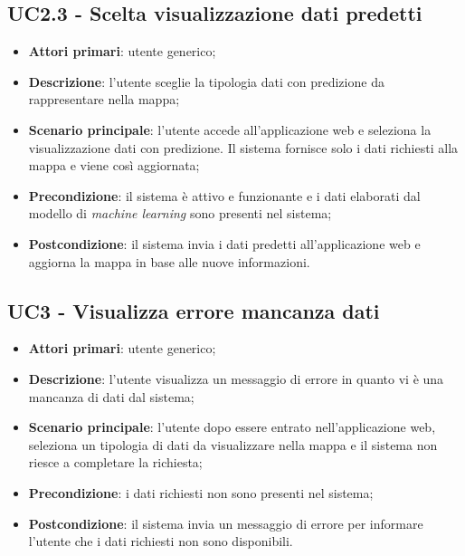 \subsection{UC2.3 - Scelta visualizzazione dati predetti}
\begin{itemize}
	\item \textbf{Attori primari}: utente generico;
	\item \textbf{Descrizione}: l'utente sceglie la tipologia dati con predizione da rappresentare nella mappa;
	\item \textbf{Scenario principale}: l'utente accede all'applicazione web e seleziona la visualizzazione dati con predizione. Il sistema fornisce solo i dati richiesti alla mappa e viene così aggiornata;
	\item \textbf{Precondizione}: il sistema è attivo e funzionante e i dati elaborati dal modello di \textit{machine learning} sono presenti nel sistema;
	\item \textbf{Postcondizione}: il sistema invia i dati predetti all'applicazione web e aggiorna la mappa in base alle nuove informazioni.
\end{itemize}

\subsection{UC3 - Visualizza errore mancanza dati}
\begin{itemize}
	\item \textbf{Attori primari}: utente generico;
	\item \textbf{Descrizione}: l'utente visualizza un messaggio di errore in quanto vi è una mancanza di dati dal sistema;
	\item \textbf{Scenario principale}: l'utente dopo essere entrato nell'applicazione web, seleziona un tipologia di dati da visualizzare nella mappa e il sistema non riesce a completare la richiesta;
	\item \textbf{Precondizione}: i dati richiesti non sono presenti nel sistema;
	\item \textbf{Postcondizione}: il sistema invia un messaggio di errore per informare l'utente che i dati richiesti non sono disponibili.
\end{itemize}
